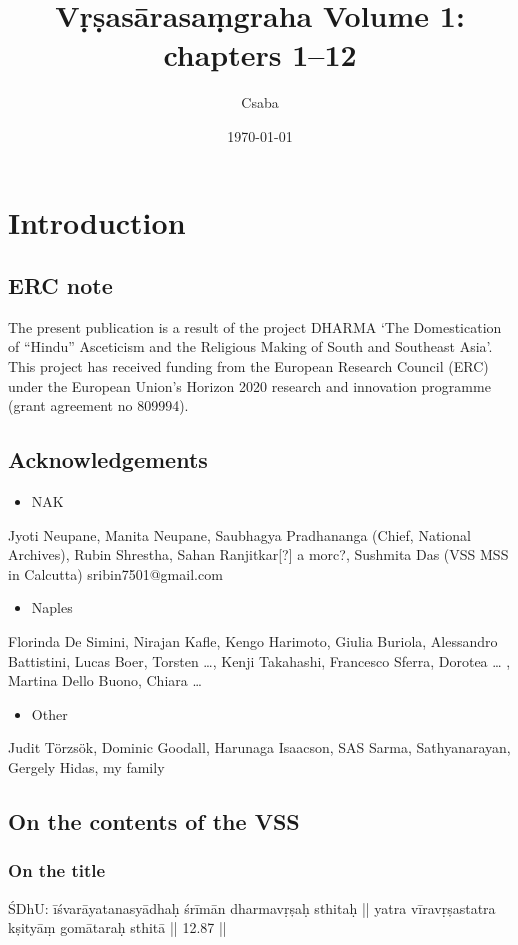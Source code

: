 \documentclass[11pt]{article}
\author{Csaba}
\date{\today}
\title{Vṛṣasārasaṃgraha Volume 1: chapters 1--12}
\begin{document}
\maketitle
\tableofcontents



\section{Introduction}
\label{sec:org3570d5f}
\subsection{ERC note}
\label{sec:org84f31c6}
The present publication is a result of the project DHARMA 
`The Domestication of ``Hindu'' Asceticism and the Religious Making of South and Southeast 
Asia'. This project has received funding from the European Research Council (ERC) 
under the European Union's Horizon 2020 research and innovation programme (grant agreement no 809994).

\subsection{Acknowledgements}
\label{sec:orgff6a7a9}
\begin{itemize}
\item NAK
\end{itemize}
Jyoti Neupane, Manita Neupane, Saubhagya Pradhananga (Chief, National Archives), Rubin Shrestha, Sahan Ranjitkar[?] a morc?,
Sushmita Das (VSS MSS in Calcutta)
sribin7501@gmail.com
\begin{itemize}
\item Naples
\end{itemize}
Florinda De Simini, Nirajan Kafle, Kengo Harimoto, Giulia Buriola, Alessandro Battistini,
Lucas Boer, Torsten \ldots{}, Kenji Takahashi, Francesco Sferra, Dorotea \ldots{} , Martina Dello Buono, Chiara \ldots{}
\begin{itemize}
\item Other
\end{itemize}
Judit Törzsök, Dominic Goodall, Harunaga Isaacson, SAS Sarma, Sathyanarayan, Gergely Hidas, my family

\subsection{On the contents of the VSS}
\label{sec:orgaed5074}
\subsubsection{On the title}
\label{sec:org8a3a12b}
ŚDhU:
īśvarāyatanasyādhaḥ śrīmān dharmavṛṣaḥ sthitaḥ ||
yatra vīravṛṣastatra kṣityāṃ gomātaraḥ sthitā || 12.87 ||
\end{document}
